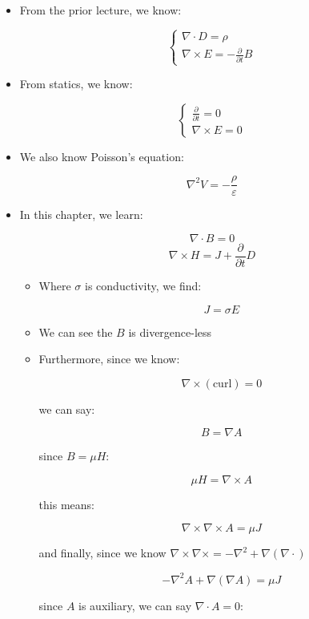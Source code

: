 \begin{itemize}

  \item From the prior lecture, we know:

    $$\left\{\begin{array}{l}\nabla\cdot D=\rho\\\nabla\times E=-\frac{\partial}{\partial t}B\end{array}$$

  \item From statics, we know:

    $$\left\{\begin{array}{l}\frac{\partial}{\partial t}=0\\\nabla\times E=0\end{array}$$

  \item We also know Poisson's equation:

    $$\nabla^2V=-\frac{\rho}{\varepsilon}$$

  \item In this chapter, we learn:

    $$\nabla\cdot B=0$$
    $$\nabla\times H=J+\frac{\partial}{\partial t}D$$

    \begin{itemize}

      \item Where $\sigma$ is conductivity, we find:

        $$J=\sigma E$$

      \item We can see the $B$ is divergence-less

      \item Furthermore, since we know:

        $$\nabla\times (\text{curl})=0$$

        we can say:

        $$B=\nabla A$$

        since $B=\mu H$:

        $$\mu H=\nabla\times A$$

        this means:

        $$\nabla\times\nabla\times A=\mu J$$

        and finally, since we know $\nabla\times\nabla\times=-\nabla^2+\nabla(\nabla\cdot)$

        $$-\nabla^2A+\nabla(\nabla A)=\mu J$$

        since $A$ is auxiliary, we can say $\nabla\cdot A=0$:


\end{itemize}
\end{itemize}
